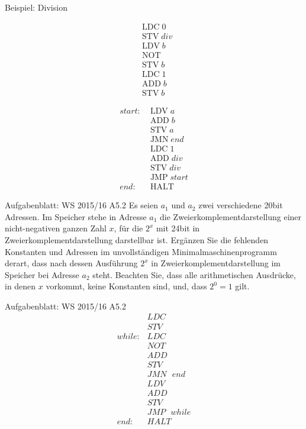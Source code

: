 \begin{frame}{Beispiel: Division}
  \begin{minipage}[t!]{0.5\textwidth}
    \begin{align*}
      &\text{LDC}\; 0\\
      &\text{STV}\; div\\
      &\text{LDV}\; b\\
      &\text{NOT}\; \\
      &\text{STV}\; b\\
      &\text{LDC}\; 1\\
      &\text{ADD}\; b\\
      &\text{STV}\; b
    \end{align*}
  \end{minipage}
  \begin{minipage}[t!]{0.4\textwidth}
    \begin{align*}
      start:\;&\text{LDV}\; a\\
      &\text{ADD}\; b\\
      &\text{STV}\; a\\
      &\text{JMN}\; end\\
      &\text{LDC}\; 1\\
      &\text{ADD}\; div\\
      &\text{STV}\; div\\
      &\text{JMP}\; start\\
      end:\;&\text{HALT}
    \end{align*}
  \end{minipage}
\end{frame}

\begin{frame}{Aufgabenblatt: WS 2015/16 A5.2}
  Es seien $a_1$ und $a_2$ zwei verschiedene 20bit Adressen. Im Speicher stehe in Adresse $a_1$ die Zweierkomplementdarstellung einer nicht-negativen ganzen Zahl $x$, für die $2^x$ mit 24bit in Zweierkomplementdarstellung darstellbar ist. Ergänzen Sie die fehlenden Konstanten und Adressen im unvollständigen Minimalmaschinenprogramm derart, dass nach dessen Ausführung $2^x$ in Zweierkomplementdarstellung im Speicher bei Adresse $a_2$ steht. Beachten Sie, dass alle arithmetischen Ausdrücke, in denen $x$ vorkommt, keine Konstanten sind, und, dass $2^0=1$ gilt.
\end{frame}

\begin{frame}{Aufgabenblatt: WS 2015/16 A5.2}
  \begin{align*}
    &LDC\\
    &STV\\
    while: &LDC\\
    &NOT\\
    &ADD\\
    &STV\\
    &JMN \text{ } end\\
    &LDV\\
    &ADD\\
    &STV\\
    &JMP\text{ }while\\
    end: &HALT
  \end{align*}
\end{frame}

